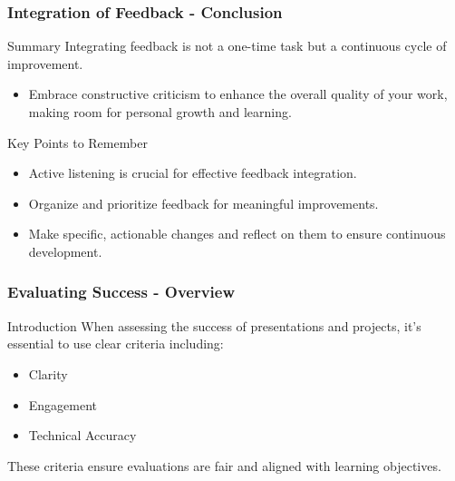 \documentclass{beamer}
\begin{document}
\begin{frame}[fragile]
    \frametitle{Integration of Feedback - Conclusion}
    \begin{block}{Summary}
        Integrating feedback is not a one-time task but a continuous cycle of improvement. 
        \begin{itemize}
            \item Embrace constructive criticism to enhance the overall quality of your work, making room for personal growth and learning.
        \end{itemize}
    \end{block}
    
    \begin{block}{Key Points to Remember}
        \begin{itemize}
            \item Active listening is crucial for effective feedback integration.
            \item Organize and prioritize feedback for meaningful improvements.
            \item Make specific, actionable changes and reflect on them to ensure continuous development.
        \end{itemize}
    \end{block}
\end{frame}

\begin{frame}[fragile]
    \frametitle{Evaluating Success - Overview}
    \begin{block}{Introduction}
        When assessing the success of presentations and projects, it's essential to use clear criteria including:
        \begin{itemize}
            \item Clarity
            \item Engagement
            \item Technical Accuracy
        \end{itemize}
        These criteria ensure evaluations are fair and aligned with learning objectives.
    \end{block}
\end{frame}
\end{document}
